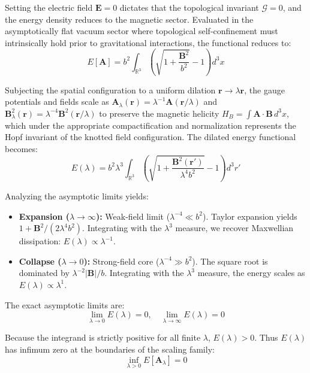 \documentclass[11pt,a4paper]{article}
\begin{document}
Setting the electric field $\mathbf{E}=0$ dictates that the topological invariant $\mathcal{G} = 0$, and the energy density reduces to the magnetic sector. Evaluated in the asymptotically flat vacuum sector where topological self-confinement must intrinsically hold prior to gravitational interactions, the functional reduces to:
\begin{equation}
E[\mathbf{A}] = b^2 \int_{\mathbb{R}^3} \left(\sqrt{1 + \frac{\mathbf{B}^2}{b^2}} - 1\right) d^3x
\end{equation}

Subjecting the spatial configuration to a uniform dilation $\mathbf{r} \to \lambda \mathbf{r}$, the gauge potentials and fields scale as $\mathbf{A}_\lambda(\mathbf{r}) = \lambda^{-1} \mathbf{A}(\mathbf{r}/\lambda)$ and $\mathbf{B}_\lambda^2(\mathbf{r}) = \lambda^{-4} \mathbf{B}^2(\mathbf{r}/\lambda)$ to preserve the magnetic helicity $H_B = \int \mathbf{A} \cdot \mathbf{B} \, d^3x$, which under the appropriate compactification and normalization represents the Hopf invariant of the knotted field configuration. The dilated energy functional becomes:
\begin{equation}
E(\lambda) = b^2 \lambda^3 \int_{\mathbb{R}^3} \left(\sqrt{1 + \frac{\mathbf{B}^2(\mathbf{r}')}{\lambda^4 b^2}} - 1\right) d^3r'
\end{equation}

Analyzing the asymptotic limits yields:
\begin{itemize}
    \item \textbf{Expansion ($\lambda \to \infty$):} Weak-field limit ($\lambda^{-4} \ll b^2$). Taylor expansion yields $1 + \mathbf{B}^2 / (2\lambda^4 b^2)$. Integrating with the $\lambda^3$ measure, we recover Maxwellian dissipation: $E(\lambda) \propto \lambda^{-1}$.
    \item \textbf{Collapse ($\lambda \to 0$):} Strong-field core ($\lambda^{-4} \gg b^2$). The square root is dominated by $\lambda^{-2}|\mathbf{B}|/b$. Integrating with the $\lambda^3$ measure, the energy scales as $E(\lambda) \propto \lambda^1$.
\end{itemize}

The exact asymptotic limits are:
\begin{equation}
\lim_{\lambda\to 0} E(\lambda) = 0, \quad \lim_{\lambda\to\infty} E(\lambda) = 0
\end{equation}

Because the integrand is strictly positive for all finite $\lambda$, $E(\lambda) > 0$. Thus $E(\lambda)$ has infimum zero at the boundaries of the scaling family:
\begin{equation}
\inf_{\lambda > 0} E[\mathbf{A}_\lambda] = 0
\end{equation}
\end{document}
